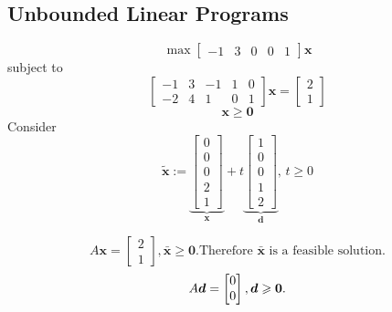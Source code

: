 \subsection{Unbounded Linear Programs}
\begin{exbox}
    \begin{example}[Unbounded LP]
        \[\max
            \begin{bmatrix}
                -1 & 3 & 0 & 0 & 1
            \end{bmatrix}\bm{x}\]
        subject to
        \[
            \begin{bmatrix}
                -1 & 3 & -1 & 1 & 0 \\
                -2 & 4 & 1  & 0 & 1
            \end{bmatrix}
            \bm{x}
            =
            \begin{bmatrix}
                2 \\
                1
            \end{bmatrix}
        \]
        \[ \bm{x}\geqslant  \bm{0} \]
        Consider
        \[\bm{\tilde{x}}:=
            \underbrace{\begin{bmatrix}
                    0 \\
                    0 \\
                    0 \\
                    2 \\
                    1
                \end{bmatrix}}_{\bm{x}}
            +
            t
            \underbrace{\begin{bmatrix}
                    1 \\
                    0 \\
                    0 \\
                    1 \\
                    2
                \end{bmatrix}}_{\bm{d}},\, t\geqslant  0
        \]

        \[
            A\bm{x}=
            \begin{bmatrix}
                2 \\
                1
            \end{bmatrix}, \bar{\bm{x}}\geqslant  \bm{0}.\text{Therefore $\bar{\bm{x}}$ is a feasible solution.}
        \]
        \[
            A\bm{d}=\begin{bmatrix}
                0 \\
                0
            \end{bmatrix}, \bm{d}\geqslant  \bm{0}.\\
        \]


\end{example}
\end{exbox}
